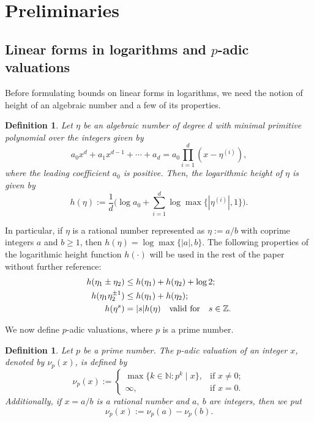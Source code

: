 \documentclass[11pt,a4paper]{article}
\newtheorem{definition}[theorem]{Definition}
\numberwithin{equation}{section}
\numberwithin{table}{section}
\numberwithin{figure}{section}
\begin{document}
\section{Preliminaries}\label{sec:prelim}

\subsection{Linear forms in logarithms and $p$-adic valuations}

Before formulating bounds on linear forms in logarithms, we need the notion of height of an algebraic number and a few of its properties. 


\begin{definition}\label{def1}
	Let $ \eta $ be an algebraic number of degree $ d $ with minimal primitive polynomial over the integers given by
	$$ a_{0}x^{d}+a_{1}x^{d-1}+\cdots+a_{d}=a_{0}\prod_{i=1}^{d}(x-\eta^{(i)}), $$ 
	where the leading coefficient $ a_{0} $ is positive. Then, the logarithmic height of $ \eta$ is given by 
	$$ h(\eta):= \dfrac{1}{d}\Big(\log a_{0}+\sum_{i=1}^{d}\log \max\{|\eta^{(i)}|,1\} \Big). $$
\end{definition}
In particular, if $ \eta$ is a rational number represented as $\eta:=a/b$ with coprime integers $a$ and $ b\ge 1$, then $ h(\eta ) = \log \max\{|a|, b\} $. 
The following properties of the logarithmic height function $ h(\cdot) $ will be used in the rest of the paper without further reference:
\begin{equation}\nonumber
	\begin{aligned}
		h(\eta_{1}\pm\eta_{2}) &\leq h(\eta_{1})+h(\eta_{2})+\log 2;\\
		h(\eta_{1}\eta_{2}^{\pm 1} ) &\leq h(\eta_{1})+h(\eta_{2});\\
		h(\eta^{s}) &= |s|h(\eta)  \quad {\text{\rm valid for}}\quad s\in \mathbb{Z}.
	\end{aligned}
\end{equation}

We now define $p$-adic valuations, where $p$ is a prime number.

\begin{definition}\label{def2.2t}
	Let \( p \) be a prime number. The \( p \)-adic valuation of an integer \( x \), denoted by $\nu_p(x)$,  is defined by
	\[
	\nu_p(x) := 
	\begin{cases} 
		\max\{k \in \mathbb{N} : p^k \mid x\}, & \text{if } x \neq 0; \\
		\infty, & \text{if } x = 0.
	\end{cases}
	\]
	Additionally, if $x=a/b$ is a rational number and $a,~b$ are integers, then we put 
	$$\nu_p(x):=\nu_p(a)-\nu_p(b).
	$$
\end{definition}
\end{document}
